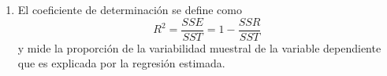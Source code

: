 \documentclass[10pt,a4paper]{article}
\begin{document}
\begin{enumerate}
{\begin{enumerate}
\begin{align*}
                    \\[2ex]
                    &=
                    SSE
                    +
                    SSR
                    \text{,}
                \end{align*}
                ya que
                \begin{align*}
                    \sum_{i=1}^n
                        \left(
                            \hat y_i
                            -
                            \bar y
                        \right)
                        \,
                        \hat u_i
                    &=
                    \sum_{i=1}^n
                        \hat y_i
                        \,
                        \hat u_i
                    -
                    \bar y
                    \,
                    \underbrace{
                        \sum_{i=1}^n
                            \hat u_i
                    }_{0}
                    \\[2ex]
                    &=
                    \sum_{i=1}^n
                        \left(
                            \hat \beta_0
                            +
                            \hat \beta_1
                            x_i
                        \right)
                        \,
                        \hat  u_i
                    \\[2ex]
                    &=
                    \hat \beta_0
                    \,
                    \underbrace{
                        \sum_{i=1}^n
                            \hat u_i
                    }_{0}
                    +
                    \hat \beta_1
                    \,
                    \underbrace{
                        \sum_{i=1}^n
                            x_i
                            \,
                            \hat u_i
                    }_{0}
                    \\[2ex]
                    &=
                    0
                    \text{.}
                    \quad
                    \blacksquare
                \end{align*}

            \item El coeficiente de determinación se define como
                $$
                    R^2
                    =
                    \frac
                        {
                            SSE
                        }
                        {
                            SST
                        }
                    =
                    1
                    -
                    \frac
                        {
                            SSR
                        }
                        {
                            SST
                        }
                $$
                y mide la proporción de la variabilidad muestral de la variable dependiente que es explicada por la regresión estimada.


\end{enumerate}}
\end{enumerate}
\end{document}
